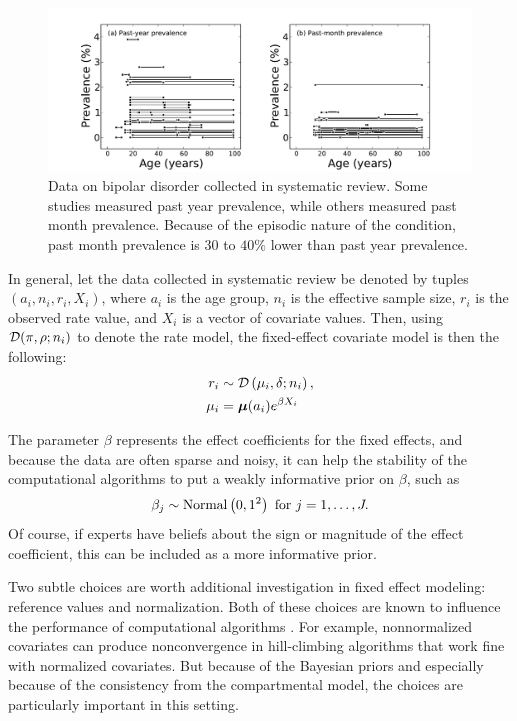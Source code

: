 \begin{figure}[h]
\begin{center}
\includegraphics[width=\textwidth]{bipolar-data-by-cv.pdf}
\caption{Data on bipolar disorder collected in systematic review.
  Some studies measured past year prevalence, while others measured
  past month prevalence.  Because of the episodic nature of the
  condition, past month prevalence is $30$ to $40\%$ lower than past
  year prevalence.}
\label{bipolar-data-cv}
\end{center}
\end{figure}


In general, let the data collected in systematic review be denoted by
tuples $\left(a_i, n_i, r_i, X_i\right)$, where $a_i$ is the age
group, $n_i$ is the effective sample size, $r_i$ is the observed rate
value, and $X_i$ is a vector of covariate values. Then, using
$\mathcal{D}(\pi, \rho; n_i)$ to denote the rate model, the fixed-effect
covariate model is then the following:
\begin{align*}
r_i &\sim \mathcal{D}\left(\mu_i, \delta; n_i\right),\\
\mu_i &= \boldsymbol{\mu}(a_i)e^{\beta X_i}
\end{align*}

The parameter $\beta$ represents the effect coefficients for
the fixed effects, and because the data are often sparse and noisy, it
can help the stability of the computational algorithms to put a weakly
informative prior on $\beta$, such as
\[
\beta_j \sim \operatorname{Normal}\left(0, 1^2\right) \text{ for } j = 1, \ldots, J.
\]
Of course, if experts have beliefs about the sign or magnitude of the
effect coefficient, this can be included as a more informative prior.

Two subtle choices are worth additional investigation in fixed effect
modeling: reference values and normalization.  Both of these choices
are known to influence the performance of computational
algorithms \cite{gelman_bayesian_2003}. For example, nonnormalized covariates can produce
nonconvergence in hill-climbing algorithms that work fine with
normalized covariates.  But because of the Bayesian priors and
especially because of the consistency from the compartmental model,
the choices are particularly important in this setting.

